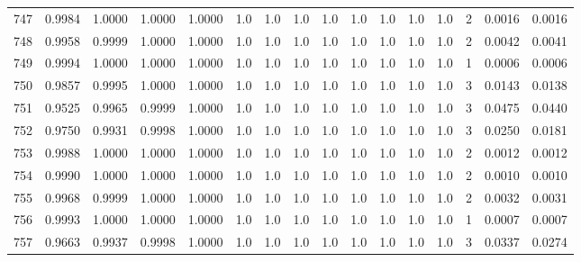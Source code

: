\begin{tabular}{lrrrrrrrrrrrrrrr}
747 &      0.9984 &  1.0000 &  1.0000 &  1.0000 &     1.0 &     1.0 &     1.0 &     1.0 &     1.0 &     1.0 &      1.0 &        1.0 &      2 &                    0.0016 &                     0.0016 \\
748 &      0.9958 &  0.9999 &  1.0000 &  1.0000 &     1.0 &     1.0 &     1.0 &     1.0 &     1.0 &     1.0 &      1.0 &        1.0 &      2 &                    0.0042 &                     0.0041 \\
749 &      0.9994 &  1.0000 &  1.0000 &  1.0000 &     1.0 &     1.0 &     1.0 &     1.0 &     1.0 &     1.0 &      1.0 &        1.0 &      1 &                    0.0006 &                     0.0006 \\
750 &      0.9857 &  0.9995 &  1.0000 &  1.0000 &     1.0 &     1.0 &     1.0 &     1.0 &     1.0 &     1.0 &      1.0 &        1.0 &      3 &                    0.0143 &                     0.0138 \\
751 &      0.9525 &  0.9965 &  0.9999 &  1.0000 &     1.0 &     1.0 &     1.0 &     1.0 &     1.0 &     1.0 &      1.0 &        1.0 &      3 &                    0.0475 &                     0.0440 \\
752 &      0.9750 &  0.9931 &  0.9998 &  1.0000 &     1.0 &     1.0 &     1.0 &     1.0 &     1.0 &     1.0 &      1.0 &        1.0 &      3 &                    0.0250 &                     0.0181 \\
753 &      0.9988 &  1.0000 &  1.0000 &  1.0000 &     1.0 &     1.0 &     1.0 &     1.0 &     1.0 &     1.0 &      1.0 &        1.0 &      2 &                    0.0012 &                     0.0012 \\
754 &      0.9990 &  1.0000 &  1.0000 &  1.0000 &     1.0 &     1.0 &     1.0 &     1.0 &     1.0 &     1.0 &      1.0 &        1.0 &      2 &                    0.0010 &                     0.0010 \\
755 &      0.9968 &  0.9999 &  1.0000 &  1.0000 &     1.0 &     1.0 &     1.0 &     1.0 &     1.0 &     1.0 &      1.0 &        1.0 &      2 &                    0.0032 &                     0.0031 \\
756 &      0.9993 &  1.0000 &  1.0000 &  1.0000 &     1.0 &     1.0 &     1.0 &     1.0 &     1.0 &     1.0 &      1.0 &        1.0 &      1 &                    0.0007 &                     0.0007 \\
757 &      0.9663 &  0.9937 &  0.9998 &  1.0000 &     1.0 &     1.0 &     1.0 &     1.0 &     1.0 &     1.0 &      1.0 &        1.0 &      3 &                    0.0337 &                     0.0274 \\

\end{tabular}
